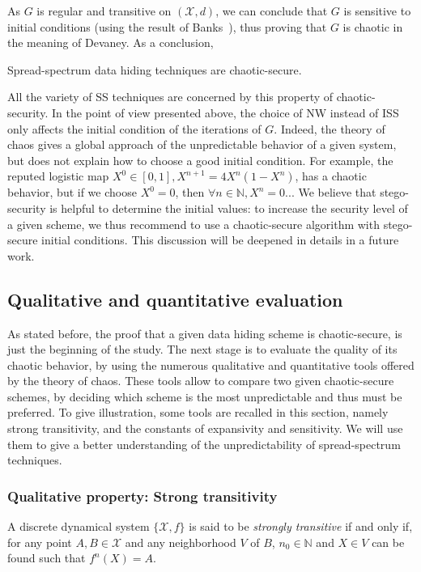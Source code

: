 \documentclass{llncs}
\begin{document}
As $G$ is regular and transitive on $(\mathcal{X},d)$, we can conclude that $G$ is sensitive to initial conditions (using the result of Banks~\cite{Banks92}), thus proving that $G$ is chaotic in the meaning of Devaney. As a conclusion,

\begin{theorem}
Spread-spectrum data hiding techniques are chaotic-secure.
\end{theorem}

All the variety of SS techniques are concerned by this property of chaotic-security. In the point of view presented above, the choice of NW instead of ISS only affects the initial condition of the iterations of $G$. Indeed, the theory of chaos gives a global approach of the unpredictable behavior of a given system, but does not explain how to choose a good initial condition. For example, the reputed logistic map $X^0 \in [0,1], X^{n+1}=4 X^n (1-X^n)$, has a chaotic behavior, but if we choose $X^0=0$, then $\forall n \in \mathds{N}, X^n = 0$... We believe that stego-security is helpful to determine the initial values: to increase the security level of a given scheme, we thus recommend to use a chaotic-secure algorithm with stego-secure initial conditions. This discussion will be deepened in details in a future work.


\subsection{Qualitative and quantitative evaluation}

As stated before, the proof that a given data hiding scheme is chaotic-secure, is just the beginning of the study. The next stage is to evaluate the quality of its chaotic behavior, by using the numerous qualitative and quantitative tools offered by the theory of chaos. These tools allow to compare two given chaotic-secure schemes, by deciding which scheme is the most unpredictable and thus must be preferred. To give illustration, some tools are recalled in this section, namely strong transitivity, and the constants of expansivity and sensitivity. We will use them to give a better understanding of the unpredictability of spread-spectrum techniques. 

\subsubsection{Qualitative property: Strong transitivity}


\begin{definition}
A discrete dynamical system $\{\mathcal{X}, f\}$ is said to be \emph{strongly transitive} if and only if, for any point $A,B \in \mathcal{X}$ and any neighborhood $V$ of $B$, $n_0 \in \mathbb{N}$ and $X\in V$ can be found such that $f^n(X) = A$.
\end{definition}
\end{document}

